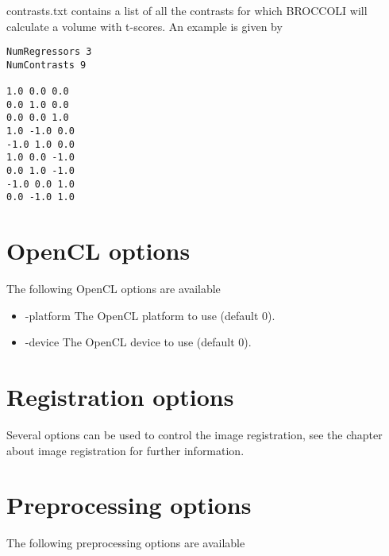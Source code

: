 contrasts.txt contains a list of all the contrasts for which BROCCOLI will calculate a volume with t-scores. An example is given by

\begin{verbatim}
NumRegressors 3
NumContrasts 9

1.0 0.0 0.0
0.0 1.0 0.0
0.0 0.0 1.0
1.0 -1.0 0.0
-1.0 1.0 0.0
1.0 0.0 -1.0
0.0 1.0 -1.0
-1.0 0.0 1.0
0.0 -1.0 1.0
\end{verbatim}

\section{OpenCL options}

The following OpenCL options are available

\begin{itemize}

\item -platform
\newline \newline The OpenCL platform to use (default 0).

\item -device
\newline \newline The OpenCL device to use (default 0).

\end{itemize}

\section{Registration options}

Several options can be used to control the image registration, see the chapter about image registration for further information.

\section{Preprocessing options}

The following preprocessing options are available

